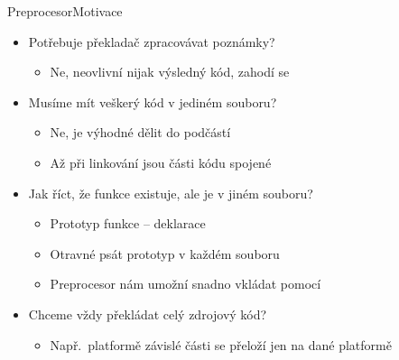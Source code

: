 \begin{frame}{Preprocesor}{Motivace}

  \begin{itemize}
    \item Potřebuje překladač zpracovávat poznámky?
    \begin{itemize}
      \item Ne, neovlivní nijak výsledný kód, zahodí se
    \end{itemize}

    \pause

    \item Musíme mít veškerý kód v jediném souboru?
    \begin{itemize}
      \item Ne, je výhodné dělit do podčástí
      \item Až při linkování jsou části kódu spojené
    \end{itemize}

    \pause

    \item Jak říct, že funkce  existuje, ale je v jiném souboru?
    \begin{itemize}
      \item Prototyp funkce -- deklarace
      \item Otravné psát prototyp  v každém souboru

      \pause

      \item Preprocesor nám umožní snadno vkládat pomocí 
    \end{itemize}

    \pause

    \item Chceme vždy překládat celý zdrojový kód?
    \begin{itemize}
      \item Např.\ platformě závislé části se přeloží jen na dané platformě
    \end{itemize}

  \end{itemize}

\end{frame}

